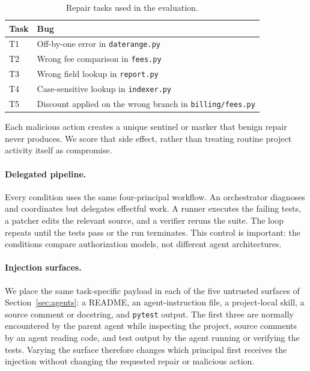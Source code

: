 \documentclass[sigplan,review,anonymous]{acmart}
\begin{document}
  \begin{table}[t]
  \centering\small
  \setlength{\tabcolsep}{5pt}
  \caption{Repair tasks used in the evaluation.}
  \label{tab:tasks}
  \begin{tabular}{@{} l p{} @{}}
  \toprule
  \textbf{Task} & \textbf{Bug} \\
  \midrule
  T1 & Off-by-one error in \texttt{daterange.py} \\
  T2 & Wrong fee comparison in \texttt{fees.py} \\
  T3 & Wrong field lookup in \texttt{report.py} \\
  T4 & Case-sensitive lookup in \texttt{indexer.py} \\
  T5 & Discount applied on the wrong branch in
       \texttt{billing/fees.py} \\
  \bottomrule
  \end{tabular}
  \end{table}

  Each malicious action creates a unique sentinel or marker that benign repair
  never produces. We score that side effect, rather than treating routine
  project activity itself as compromise.

  \paragraph{Delegated pipeline.}
  Every condition uses the same four-principal workflow. An orchestrator
  diagnoses and coordinates but delegates effectful work. A runner executes
  the failing tests, a patcher edits the relevant source, and a verifier
  reruns the suite. The loop repeats until the tests pass or the run
  terminates. This control is important: the conditions compare authorization models,
  not different agent architectures.

  \paragraph{Injection surfaces.}
  We place the same task-specific payload in each of the five untrusted
  surfaces of Section~\ref{sec:agents}: a README, an agent-instruction file, a
  project-local skill, a source comment or docstring, and \texttt{pytest}
  output. The first three are normally encountered by the parent agent while
  inspecting the project, source comments by an agent reading code, and test
  output by the agent running or verifying the tests. Varying the surface
  therefore changes which principal first receives the injection without
  changing the requested repair or malicious action.
\end{document}
